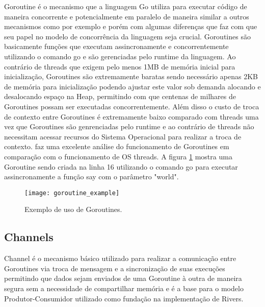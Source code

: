Goroutine é o mecanismo que a linguagem Go utiliza para executar código de maneira concorrente e potencialmente em paralelo de maneira similar a outros mecanismos como por exemplo \cite{article:wikipedia:coroutines} e \cite{article:wikipedia:threads} porém com algumas diferenças que faz com que seu papel no modelo de concorrência da linguagem seja crucial. Goroutines são basicamente funções que executam assincronamente e concorrentemente utilizando o comando go e são gerenciadas pelo runtime da linguagem. Ao contrário de threads que exigem pelo menos 1MB de memória inicial para inicialização, Goroutines são extremamente baratas sendo necessário apenas 2KB de memória para inicialização podendo ajustar este valor sob demanda alocando e desalocando espaço na Heap, permitindo com que centenas de milhares de Goroutines possam ser executadas concorrentemente. Além disso o custo de troca de contexto entre Goroutines é extremamente baixo comparado com threads uma vez que Goroutines são genrenciadas pelo runtime e ao contrário de threads não necessitam acessar recursos do Sistema Operacional para realizar a troca de contexto. \cite{blog:how_goroutines_work} faz uma excelente análise do funcionamento de Goroutines em comparação com o funcionamento de OS threads. A figura \ref{code:goroutine:example} mostra uma Goroutine sendo criada na linha 16 utilizando o comando go para executar assincronamente a função say com o parâmetro "world".

\begin{figure}[H]
  \texttt{[image: goroutine\_example]}
  \centering
  \caption{Exemplo de uso de Goroutines.}
  \label{code:goroutine:example}
\end{figure}

\subsection{Channels}
\label{subsec:channels}

Channel é o mecanismo básico utilizado para realizar a comunicação entre Goroutines via troca de mensagem e a sincronização de suas execuções permitindo que dados sejam enviados de uma Goroutine à outra de maneira segura sem a necessidade de compartilhar memória e é a base para o modelo Produtor-Consumidor \cite{paper:david_kocher:producer_consumer} utilizado como fundação na implementação de Rivers.

